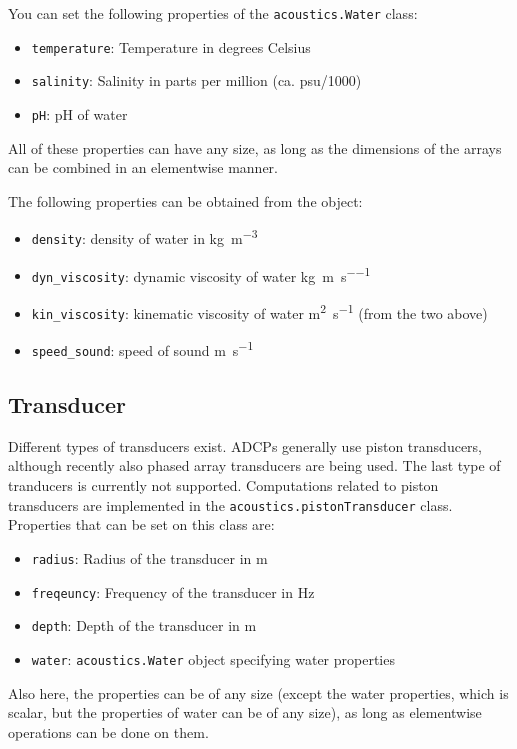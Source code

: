 \documentclass[]{article}
\begin{document}
You can set the following properties of the \lstinline!acoustics.Water! class:
\begin{itemize}
  \item \lstinline!temperature!: Temperature in degrees Celsius
  \item \lstinline!salinity!: Salinity in parts per million (ca. psu/1000)
  \item \lstinline!pH!: pH of water
\end{itemize}
All of these properties can have any size, as long as the dimensions of the arrays can be combined in an elementwise manner.

The following properties can be obtained from the object:
\begin{itemize}
  \item \lstinline!density!: density of water in \si{\kilo\gram\per\cubic\meter} \citep[equation 8, ][]{sharqawy2010}
  \item \lstinline!dyn_viscosity!: dynamic viscosity of water \si{\kilo\gram\per\m\per\s} \citep[equations 22 and 23, ][]{sharqawy2010}
  \item \lstinline!kin_viscosity!: kinematic viscosity of water \si{\m\squared\per\s} (from the two above)
  \item \lstinline!speed_sound!: speed of sound \si{\m\per\s} \citep[equation 3.3.3, ][]{medwin1998}
\end{itemize}
\subsection{Transducer}
Different types of transducers exist. ADCPs generally use piston transducers, although recently also phased array transducers are being used. The last type of tranducers is currently not supported. Computations related to piston transducers are implemented in the \lstinline!acoustics.pistonTransducer! class. Properties that can be set on this class are:
\begin{itemize}
  \item \lstinline!radius!: Radius of the transducer in \si{\m}
  \item \lstinline!freqeuncy!: Frequency of the transducer in \si{\hertz}
  \item \lstinline!depth!: Depth of the transducer in \si{\m}
  \item \lstinline!water!: \lstinline!acoustics.Water! object specifying water properties 
\end{itemize}
Also here, the properties can be of any size (except the water properties, which is scalar, but the properties of water can be of any size), as long as elementwise operations can be done on them.
\end{document}
